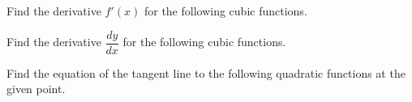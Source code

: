 \documentclass[12pt, a4paper, addpoints]{exam}
\newcommand{\ts}{\vspace{6 mm}}
\newcommand{\ms}{\vspace{11 mm}}
\begin{document}
\begin{questions}
\ts


\question Find the derivative $f'(x)$ for the following cubic functions.
\setlength{\columnsep}{11pt}
\begin{multicols}{4} \Large
{}
\end{multicols}
\ms 
\question Find the derivative $\dfrac{dy}{dx}$ for the following cubic functions.
\setlength{\columnsep}{7pt}
\begin{multicols}{2}
\end{multicols}
\ms
\newpage
\question Find the equation of the tangent line to the following quadratic functions at the given point.
\setlength{\columnsep}{7pt}
\begin{parts}\Large

\end{parts}
\end{questions}
\end{document}
